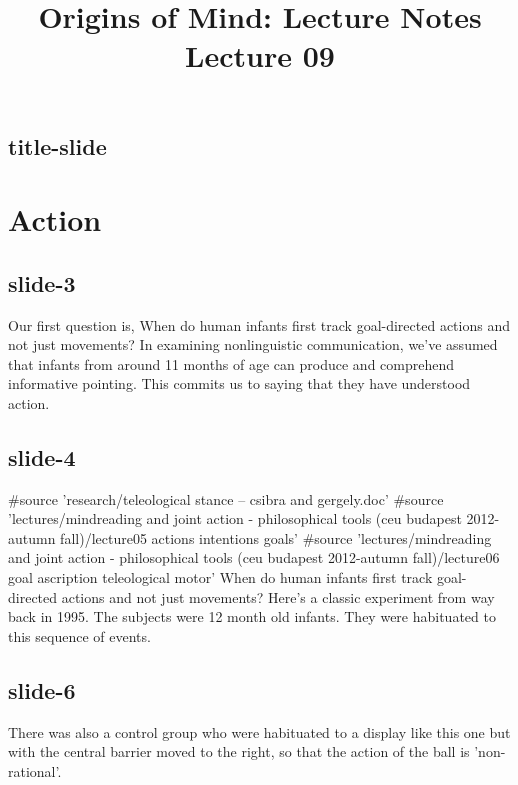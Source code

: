 \documentclass[12pt,\papersize]{extarticle}
\begin{document}
\setlength\footnotesep{1em}







\title {Origins of Mind: Lecture Notes \\ Lecture 09}
 
\maketitle
 
 
\subsection{title-slide}
 
\section{Action}
 
 
\subsection{slide-3}
Our first question is, When do human infants first track goal-directed actions and not just movements?
In examining nonlinguistic communication, we've assumed that infants from around 11 months of age can produce and comprehend informative pointing.
This commits us to saying that they have understood action.
 
 
\subsection{slide-4}
\#source 'research/teleological stance -- csibra and gergely.doc'
\#source 'lectures/mindreading and joint action - philosophical tools (ceu budapest 2012-autumn fall)/lecture05 actions intentions goals'
\#source 'lectures/mindreading and joint action - philosophical tools (ceu budapest 2012-autumn fall)/lecture06 goal ascription teleological motor'
When do human infants first track goal-directed actions and not just movements?
Here's a classic experiment from way back in 1995.
The subjects were 12 month old infants.
They were habituated to this sequence of events.
 
 
\subsection{slide-6}
There was also a control group who were habituated to a display like this one but with the central barrier moved to the right, so that the action of the ball is 'non-rational'.
 
\end{document}
